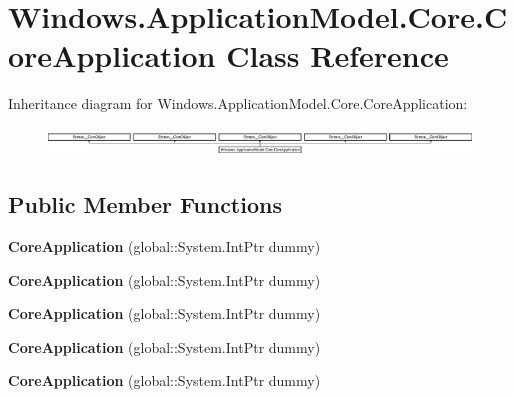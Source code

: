 \hypertarget{class_windows_1_1_application_model_1_1_core_1_1_core_application}{}\section{Windows.\+Application\+Model.\+Core.\+Core\+Application Class Reference}
\label{class_windows_1_1_application_model_1_1_core_1_1_core_application}
Inheritance diagram for Windows.\+Application\+Model.\+Core.\+Core\+Application\+:\begin{figure}[H]
\begin{center}
\leavevmode
\includegraphics[height=0.749164cm]{class_windows_1_1_application_model_1_1_core_1_1_core_application}
\end{center}
\end{figure}
\subsection*{Public Member Functions}
\begin{DoxyCompactItemize}
\item 
\mbox{\label{class_windows_1_1_application_model_1_1_core_1_1_core_application_aaaf2d013b89dfe59fbae9a0653fc133e}} 
{\bfseries Core\+Application} (global\+::\+System.\+Int\+Ptr dummy)
\item 
\mbox{\label{class_windows_1_1_application_model_1_1_core_1_1_core_application_aaaf2d013b89dfe59fbae9a0653fc133e}} 
{\bfseries Core\+Application} (global\+::\+System.\+Int\+Ptr dummy)
\item 
\mbox{\label{class_windows_1_1_application_model_1_1_core_1_1_core_application_aaaf2d013b89dfe59fbae9a0653fc133e}} 
{\bfseries Core\+Application} (global\+::\+System.\+Int\+Ptr dummy)
\item 
\mbox{\label{class_windows_1_1_application_model_1_1_core_1_1_core_application_aaaf2d013b89dfe59fbae9a0653fc133e}} 
{\bfseries Core\+Application} (global\+::\+System.\+Int\+Ptr dummy)
\item 
\mbox{\label{class_windows_1_1_application_model_1_1_core_1_1_core_application_aaaf2d013b89dfe59fbae9a0653fc133e}} 
{\bfseries Core\+Application} (global\+::\+System.\+Int\+Ptr dummy)
\end{DoxyCompactItemize}
